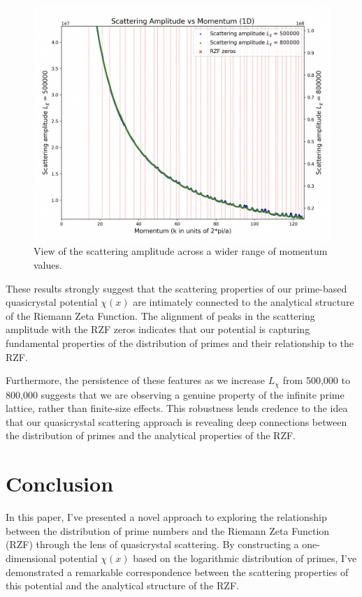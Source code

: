 \documentclass[11pt, oneside]{article}
\begin{document}
\begin{figure}[htbp]
\begin{center}
    \includegraphics[width=0.8\linewidth]{../images/large_scattering.png}
\caption{View of the scattering amplitude across a wider range of momentum values.}
\label{fig:scattering_amplitude_large}
\end{center}
\end{figure}

These results strongly suggest that the scattering properties of our prime-based quasicrystal potential $\chi(x)$ are intimately connected to the analytical structure of the Riemann Zeta Function. The alignment of peaks in the scattering amplitude with the RZF zeros indicates that our potential is capturing fundamental properties of the distribution of primes and their relationship to the RZF.

Furthermore, the persistence of these features as we increase $L_\chi$ from 500,000 to 800,000 suggests that we are observing a genuine property of the infinite prime lattice, rather than finite-size effects. This robustness lends credence to the idea that our quasicrystal scattering approach is revealing deep connections between the distribution of primes and the analytical properties of the RZF.

\section{Conclusion}

In this paper, I've presented a novel approach to exploring the relationship between the distribution of prime numbers and the Riemann Zeta Function (RZF) through the lens of quasicrystal scattering. By constructing a one-dimensional potential $\chi(x)$ based on the logarithmic distribution of primes, I've demonstrated a remarkable correspondence between the scattering properties of this potential and the analytical structure of the RZF.
\end{document}
